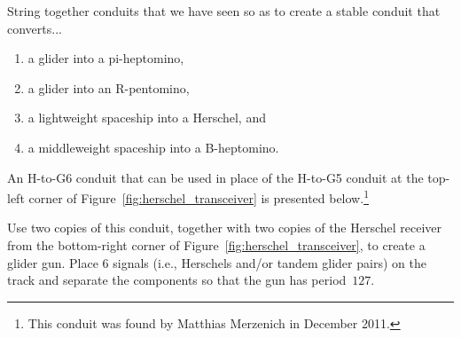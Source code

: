 \begin{multicols}{2}
	
	\mfilbreak
	
	
	\begin{problem}\label{exer:composite_converters} 
		String together conduits that we have seen so as to create a stable conduit that converts...\smallskip
		
		\begin{enumerate}[label=\bf\color{ocre}(\alph*)]
			\item a glider into a pi-heptomino,
			
			\item a glider into an R-pentomino,
			
			\item a lightweight spaceship into a Herschel, and
			
			\item a middleweight spaceship into a B-heptomino.
		\end{enumerate}
	\end{problem}
	
	
	\mfilbreak
	
	
	\begin{problem}\label{exer:h_to_g6} 
		An H-to-G6 conduit that can be used in place of the H-to-G5 conduit at the top-left corner of Figure~\ref{fig:herschel_transceiver} is presented below.\footnote{This conduit was found by Matthias Merzenich in December 2011.}
		
		\begin{center}
		\end{center}
		
		\noindent Use two copies of this conduit, together with two copies of the Herschel receiver from the bottom-right corner of Figure~\ref{fig:herschel_transceiver}, to create a glider gun. Place $6$ signals (i.e., Herschels and/or tandem glider pairs) on the track and separate the components so that the gun has period~$127$.
	\end{problem}


\end{multicols}
